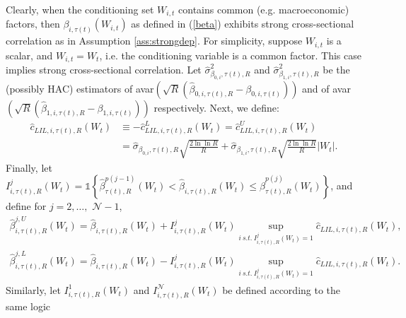 Clearly, when the conditioning set $W_{i,t}$ contains common (e.g. macroeconomic) factors, then $\beta_{i,\tau(t)} \left( W_{i,t}\right)$ as defined in (\ref{beta}) exhibits strong cross-sectional correlation as in Assumption \ref{ass:strongdep}. For simplicity, suppose $W_{i,t}$ is a scalar, and $W_{i,t}=W_t$, i.e. the conditioning variable is a common factor. This case implies strong cross-sectional correlation. Let $\widehat{\sigma }_{\beta_{0,i},\tau(t),R}^{2}$ and $\widehat{\sigma}_{\beta_{1,i},\tau(t),R}^{2}$ be the (possibly HAC) estimators of \textrm{avar}$\left( \sqrt{R}\left( \widehat{\beta}_{0,i,\tau(t),R} - \beta_{0,i,\tau(t)} \right) \right) $ and of \textrm{avar}$\left( \sqrt{R}\left( \widehat{\beta}_{1,i,\tau(t),R} - \beta_{1,i,\tau(t)} \right) \right)$ respectively. Next, we define:
\begin{align*}
    \widehat{c}_{LIL,i,\tau(t),R}\left( W_t \right) &\equiv - \widehat{c}^L_{LIL,i,\tau(t),R}\left( W_t \right) = \widehat{c}^U_{LIL,i,\tau(t),R}\left( W_t \right) \\
    &= \widehat{\sigma}_{\beta_{0,i},\tau(t),R}\sqrt{\frac{2\ln \ln R}{R}}+ \widehat{\sigma}_{\beta_{1,i},\tau(t),R}\sqrt{\frac{2\ln \ln R}{R}}\left\vert W_t \right\vert.
\end{align*}
Finally, let $I_{i,\tau(t),R}^j\left( W_t \right) = \mathds{1} \left\{ \widehat{\beta}_{\tau(t),R}^{p(j-1)}\left( W_t \right) <\widehat{\beta}_{i,\tau(t),R}\left( W_t \right) \leq \widehat{\beta}_{\tau(t),R}^{p(j)}\left( W_t \right) \right\}$, and define for $j=2,\dots,$ $\mathcal{N}-1$, 
\begin{align*}
	\widehat{\beta}_{i,\tau(t),R}^{j,U} \left( W_t \right) = \widehat{\beta}_{i,\tau(t),R} \left( W_t \right) + I_{i,\tau(t),R}^j\left( W_t \right) \sup_{i \ s.t. \ I_{i,\tau(t),R}^j\left( W_t \right)=1} \widehat{c}_{LIL,i,\tau(t),R}\left( W_t \right),
\end{align*}
\begin{align*}
	\widehat{\beta}_{i,\tau(t),R}^{j,L} \left( W_t \right) = \widehat{\beta}_{i,\tau(t),R} \left( W_t \right) - I_{i,\tau(t),R}^j\left( W_t \right) \sup_{i \ s.t. \ I_{i,\tau(t),R}^j\left( W_t \right)=1} \widehat{c}_{LIL,i,\tau(t),R}\left( W_t \right).
\end{align*}
Similarly, let $I_{i,\tau(t),R}^1\left( W_t \right)$ and $I_{i,\tau(t),R}^\mathcal{N}\left( W_t \right)$ be defined according to the same logic %
